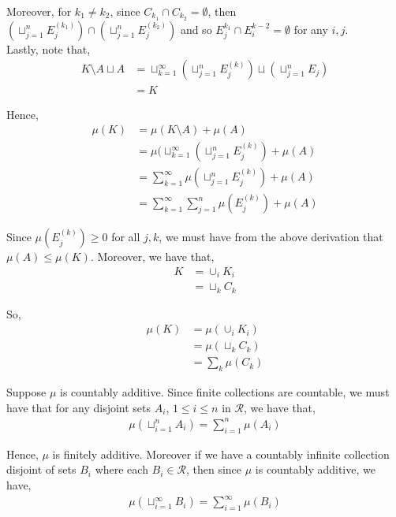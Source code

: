 \documentclass[12pt]{article}
\newenvironment{problem}[2][Problem]{\begin{trivlist}
\item[\hskip \labelsep {\bfseries #1}\hskip \labelsep {\bfseries #2.}]}{\end{trivlist}}
\begin{document}
Moreover, for $k_1 \neq k_2$, since $C_{k_1} \cap C_{k_2} = \emptyset$, then $\left(\sqcup_{j=1}^n E_j^{(k_1)}\right) \cap \left(\sqcup_{j=1}^n E_j^{(k_2)}\right)$ and so $E_j^{k_1} \cap E_i^{k-2} = \emptyset$ for any $i, j$.\\

Lastly, note that,
\begin{align*}
K \setminus A \sqcup A &= \sqcup_{k=1}^{\infty} \left(\sqcup_{j=1}^n E_j^{(k)}\right) \sqcup \left(\sqcup_{j=1}^n E_j\right) \\
&= K
\end{align*}

Hence,
\begin{align*}
\mu(K) &= \mu(K \setminus A) + \mu(A)\\
&= \mu(\sqcup_{k=1}^{\infty} \left(\sqcup_{j=1}^n E_j^{(k)}\right) + \mu(A)\\
&= \sum_{k=1}^{\infty} \mu(\sqcup_{j=1}^n E_j^{(k)}) + \mu(A)\\
&= \sum_{k=1}^{\infty} \sum_{j=1}^n \mu(E_j^{(k)}) + \mu(A)
\end{align*}

Since $\mu(E_j^{(k)}) \geq 0$ for all $j, k$, we must have from the above derivation that $\mu(A) \leq \mu(K)$. Moreover, we have that,
\begin{align*}
K &= \cup_i K_i\\
&= \sqcup_k C_k
\end{align*}

So,
\begin{align*}
\mu(K) &= \mu(\cup_i K_i)\\
&= \mu(\sqcup_k C_k)\\
&= \sum_k \mu(C_k)
\end{align*}
\begin{problem}{5}
\end{problem}

Suppose $\mu$ is countably additive. Since finite collections are countable, we must have that for any disjoint sets $A_i$, $1 \leq i \leq n$ in $\mathcal{R}$, we have that,
\begin{align*}
\mu\left(\sqcup_{i=1}^n A_i \right) = \sum_{i=1}^n \mu(A_i)
\end{align*}

Hence, $\mu$ is finitely additive. Moreover if we have a countably infinite collection disjoint of sets $B_i$ where each $B_i \in \mathcal{R}$, then since $\mu$ is countably additive, we have,
\begin{align*}
\mu\left(\sqcup_{i=1}^{\infty} B_i \right) = \sum_{i=1}^{\infty} \mu(B_i)
\end{align*}
\end{document}
